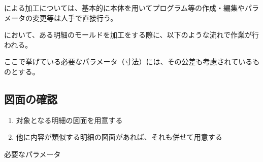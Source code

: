 \clearpage
\MMC による加工については、基本的に\MMC 本体を用いてプログラム等の作成・編集やパラメータの変更等は人手で直接行う。



\clearpage
\MMC において、ある明細のモールドを加工をする際に、以下のような流れで作業が行われる。
\begin{marker}
ここで挙げている必要なパラメータ（寸法）には、その公差も考慮されているものとする。
\end{marker}


\subsection{図面の確認}
\begin{enumerate}
\item 対象となる明細の図面を用意する
\item 他に内容が類似する明細の図面があれば、それも併せて用意する
\end{enumerate}
\begin{Parameter}{必要なパラメータ}
\PMDrawingExists%
\PMDrawingNumber%
\end{Parameter}


